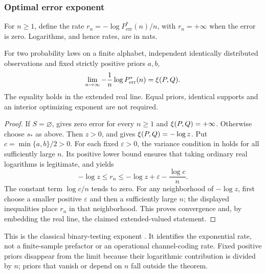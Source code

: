 \subsubsection{Optimal error exponent}
\label{sec:chernoff-exponent}

For $n\ge1$, define the rate
$r_n=-\log P_{\mathrm{err}}^*(n)/n$, with $r_n=+\infty$ when
the error is zero. Logarithms, and hence rates, are in nats.

\begin{theorem}
\label{thm:chernoff-exponent}
For two probability laws on a finite alphabet, independent identically
distributed observations and fixed strictly positive priors $a,b$,
\begin{equation}
 \lim_{n\to\infty}-\frac1n\log P_{\mathrm{err}}^*(n)
 =\xi(P,Q).
 \label{eq:error-exponent}
\end{equation}
The equality holds in the extended real line. Equal priors, identical
supports and an interior optimizing exponent are not required.
\end{theorem}
\begin{proof}
If $S=\varnothing$,  gives zero error
for every $n\ge1$ and $\xi(P,Q)=+\infty$.
Otherwise choose $s_*$ as above. Then $z>0$, and
 gives
$\xi(P,Q)=-\log z$.
Put $c=\min\{a,b\}/2>0$. For each fixed $\varepsilon>0$,
the variance condition in  holds for
all sufficiently large $n$. Its positive lower bound ensures
that taking ordinary real logarithms is legitimate, and yields
\[
 -\log z\le r_n\le-\log z+\varepsilon-\frac{\log c}{n}.
\]
The constant term $\log c/n$ tends to zero. For any neighborhood
of $-\log z$, first choose a smaller positive $\varepsilon$ and
then a sufficiently large $n$; the displayed inequalities place
$r_n$ in that neighborhood. This proves convergence and, by
embedding the real line, the claimed extended-valued statement.
\end{proof}

This is the classical binary-testing exponent
\cite{chernoff1952measure,cover2006elements}. It identifies the
exponential rate, not a finite-sample prefactor or an operational
channel-coding rate. Fixed positive priors disappear from the limit
because their logarithmic contribution is divided by $n$; priors
that vanish or depend on $n$ fall outside the theorem.
